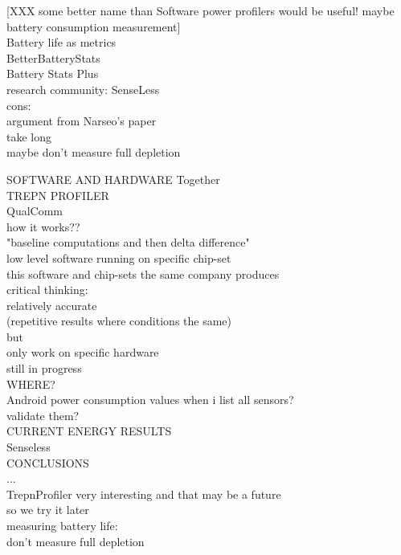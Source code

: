 [XXX some better name than Software power profilers would be useful!
 maybe battery consumption measurement]\\

Battery life as metrics\\
	BetterBatteryStats\\
	Battery Stats Plus\\
	research community: SenseLess\cite{benabdesslem:senseless}\\
	cons:\\
		argument from Narseo's paper\\
		take long\\
			maybe don't measure full depletion
	
	
	
SOFTWARE AND HARDWARE Together\\
	TREPN PROFILER\cite{qualcomm:trepnprofiler}\\
		QualComm\\
		how it works??\\
			"baseline computations and then delta difference"\\	
			low level software running on specific chip-set\\
				this software and chip-sets the same company produces\\
		critical thinking:\\
			relatively accurate\\
				(repetitive results where conditions the same)\\
			but\\
				only work on specific hardware \\
				still in progress\\
		
WHERE?\\
	Android power consumption values when i list all sensors?\\
		validate them?\\

CURRENT ENERGY RESULTS\\
	Senseless\cite{benabdesslem:senseless}\\
	

CONCLUSIONS\\
	...\\
	TrepnProfiler very interesting and that may be a future\\
		so we try it later \\
	measuring battery life:\\
		 don't measure full depletion\\


